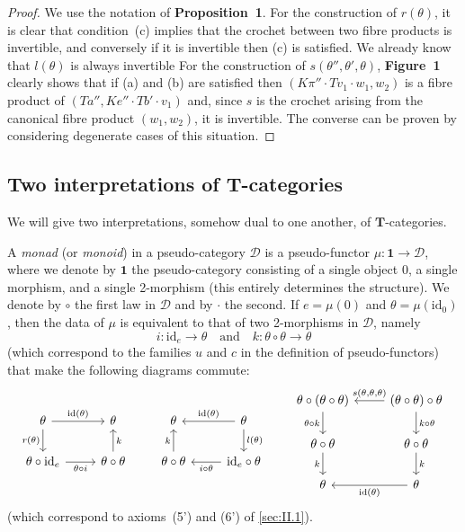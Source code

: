 \documentclass[fleqn]{article}
\newcommand{\oldpage}[1]{\marginpar{\footnotesize$\Big\vert$ \textit{p.~#1}}}
\newcommand{\unsure}[1]{{\color{purple}\textbf{#1}}}
\newcommand{\id}{\mathrm{id}}
\newcommand{\TT}{\mathbf{T}}
\newcommand{\textand}{\quad\text{and}\quad}
\newcommand{\cat}[1]{\mathcal{#1}}
\begin{document}
\begin{proof}
  \oldpage{257}
  We use the notation of \unsure{Proposition~1}.
  For the construction of $r(\theta)$, it is clear that condition~(c) implies that the crochet between two fibre products is invertible, and conversely if it is invertible then (c) is satisfied.
  We already know that $l(\theta)$ is always invertible
  For the construction of $s(\theta'',\theta',\theta)$, \unsure{Figure~1} clearly shows that if (a) and (b) are satisfied then $(K\pi''\cdot Tv_1\cdot w_1,w_2)$ is a fibre product of $(Ta'',Ke''\cdot Tb'\cdot v_1)$ and, since $s$ is the crochet arising from the canonical fibre product $(w_1,w_2)$, it is invertible.
  The converse can be proven by considering degenerate cases of this situation.
\end{proof}



\subsection{Two interpretations of $\TT$-categories}
\label{sec:II.3}

We will give two interpretations, somehow dual to one another, of $\TT$-categories.

A \emph{monad} (or \emph{monoid}) in a pseudo-category $\cat{D}$ is a pseudo-functor $\mu\colon\mathbf{1}\to\cat{D}$, where we denote by $\mathbf{1}$ the pseudo-category consisting of a single object $0$, a single morphism, and a single 2-morphism (this entirely determines the structure).
We denote by $\circ$ the first law in $\cat{D}$ and by $\cdot$ the second.
If $e=\mu(0)$ and $\theta=\mu(\id_0)$, then the data of $\mu$ is equivalent to that of two 2-morphisms in $\cat{D}$, namely
\[
  i\colon\id_e\to\theta
  \textand
  k\colon\theta\circ\theta\to\theta
\]
(which correspond to the families $u$ and $c$ in the definition of pseudo-functors) that make the following diagrams commute:
\[
  \begin{tikzcd}
    \theta
      \ar[r,"\id(\theta)"]
      \ar[d,swap,"r(\theta)"]
    & \theta
  \\\theta\circ\id_e
      \ar[r,swap,"\theta\circ i"]
    & \theta\circ\theta
      \ar[u,swap,"k"]
  \end{tikzcd}
  \qquad
  \begin{tikzcd}
    \theta
    & \theta
        \ar[l,swap,"\id(\theta)"]
        \ar[d,"l(\theta)"]
  \\\theta\circ\theta
        \ar[u,"k"]
    & \id_e\circ\theta
        \ar[l,"i\circ\theta"]
  \end{tikzcd}
  \qquad
  \begin{tikzcd}
    \theta\circ(\theta\circ\theta)
      \ar[d,swap,"\theta\circ k"]
    & (\theta\circ\theta)\circ\theta
      \ar[l,swap,"{s(\theta,\theta,\theta)}"]
      \ar[d,"k\circ\theta"]
  \\\theta\circ\theta
      \ar[d,swap,"k"]
    & \theta\circ\theta
      \ar[d,"k"]
  \\ \theta
    & \theta
      \ar[l,"\id(\theta)"]
  \end{tikzcd}
\]
(which correspond to axioms~(5') and (6') of \cref{sec:II.1}).
\end{document}
